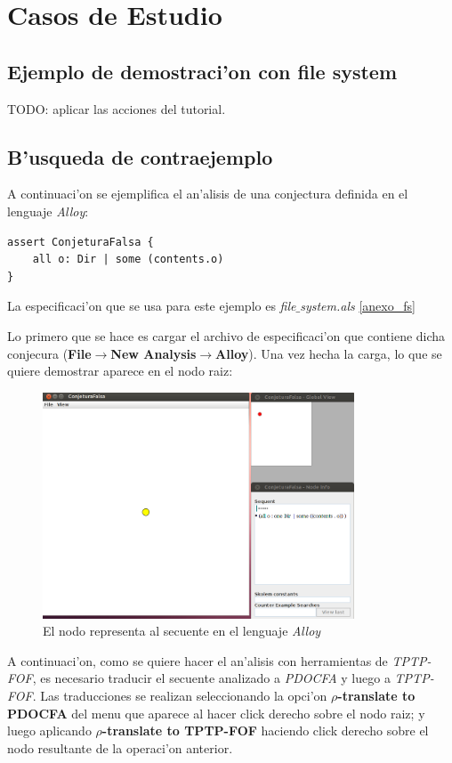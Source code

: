 \chapter{Casos de Estudio}

\section{Ejemplo de demostraci'on con file system}

TODO: aplicar las acciones del tutorial.


\section{B'usqueda de contraejemplo}

A continuaci'on se ejemplifica el an'alisis de una conjectura definida en el lenguaje \textit{Alloy}:

\begin{verbatim}
assert ConjeturaFalsa {
    all o: Dir | some (contents.o)
}
\end{verbatim}

La especificaci'on que se usa para este ejemplo es \textit{file$\_$system.als} \ref{anexo_fs}

Lo primero que se hace es cargar el archivo de especificaci'on que contiene dicha conjecura (\textbf{File$\rightarrow$New Analysis$\rightarrow$Alloy}). Una vez hecha la carga, lo que se quiere demostrar aparece en el nodo raiz:

\begin{figure}[H]
	\includegraphics[width=350px]{img/conjetura_falsa_1.png}
	\centering
	\caption{El nodo representa al secuente en el lenguaje \textit{Alloy}}
\end{figure}

A continuaci'on, como se quiere hacer el an'alisis con herramientas de \textit{TPTP-FOF}, es necesario traducir el secuente analizado a \textit{PDOCFA} y luego a \textit{TPTP-FOF}. Las traducciones se realizan seleccionando la opci'on \textbf{$\rho$-translate to PDOCFA} del menu que aparece al hacer click derecho sobre el nodo raiz; y luego aplicando \textbf{$\rho$-translate to TPTP-FOF} haciendo click derecho sobre el nodo resultante de la operaci'on anterior. 

